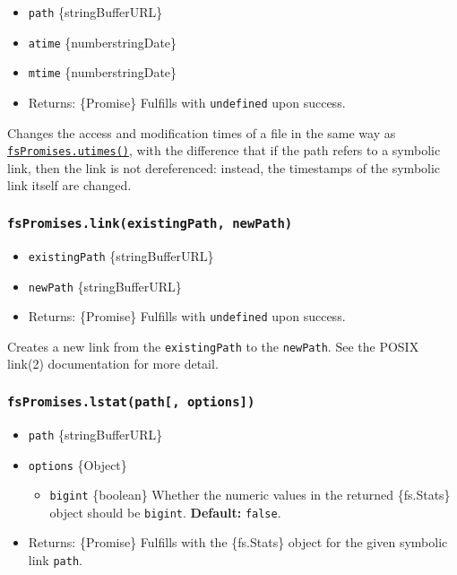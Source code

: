 \begin{itemize}
\tightlist
\item
  \texttt{path} \{string\textbar Buffer\textbar URL\}
\item
  \texttt{atime} \{number\textbar string\textbar Date\}
\item
  \texttt{mtime} \{number\textbar string\textbar Date\}
\item
  Returns: \{Promise\} Fulfills with \texttt{undefined} upon success.
\end{itemize}

Changes the access and modification times of a file in the same way as
\hyperref[fspromisesutimespath-atime-mtime]{\texttt{fsPromises.utimes()}},
with the difference that if the path refers to a symbolic link, then the
link is not dereferenced: instead, the timestamps of the symbolic link
itself are changed.

\subsubsection{\texorpdfstring{\texttt{fsPromises.link(existingPath,\ newPath)}}{fsPromises.link(existingPath, newPath)}}\label{fspromises.linkexistingpath-newpath}

\begin{itemize}
\tightlist
\item
  \texttt{existingPath} \{string\textbar Buffer\textbar URL\}
\item
  \texttt{newPath} \{string\textbar Buffer\textbar URL\}
\item
  Returns: \{Promise\} Fulfills with \texttt{undefined} upon success.
\end{itemize}

Creates a new link from the \texttt{existingPath} to the
\texttt{newPath}. See the POSIX link(2) documentation for more detail.

\subsubsection{\texorpdfstring{\texttt{fsPromises.lstat(path{[},\ options{]})}}{fsPromises.lstat(path{[}, options{]})}}\label{fspromises.lstatpath-options}

\begin{itemize}
\tightlist
\item
  \texttt{path} \{string\textbar Buffer\textbar URL\}
\item
  \texttt{options} \{Object\}

  \begin{itemize}
  \tightlist
  \item
    \texttt{bigint} \{boolean\} Whether the numeric values in the
    returned \{fs.Stats\} object should be \texttt{bigint}.
    \textbf{Default:} \texttt{false}.
  \end{itemize}
\item
  Returns: \{Promise\} Fulfills with the \{fs.Stats\} object for the
  given symbolic link \texttt{path}.
\end{itemize}

